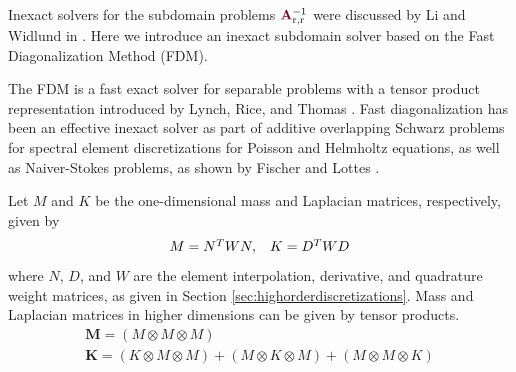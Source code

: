 Inexact solvers for the subdomain problems ${\color{burgundy}\mathbf{A}}_{\text{r}, \text{r}}^{-1}$ were discussed by Li and Widlund in \cite{li2007use}.
Here we introduce an inexact subdomain solver based on the Fast Diagonalization Method (FDM).

The FDM is a fast exact solver for separable problems with a tensor product representation introduced by Lynch, Rice, and Thomas \cite{lynch1964direct}.
Fast diagonalization has been an effective inexact solver as part of additive overlapping Schwarz problems for spectral element discretizations for Poisson and Helmholtz equations, as well as Naiver-Stokes problems, as shown by Fischer and Lottes \cite{fischer2005hybrid}.

Let $M$ and $K$ be the one-dimensional mass and Laplacian matrices, respectively, given by
\begin{equation}
\begin{array}{c c}
M = N^T W N,  &  K = D^T W D
\end{array}
\end{equation}
where $N$, $D$, and $W$ are the element interpolation, derivative, and quadrature weight matrices, as given in Section \ref{sec:highorderdiscretizations}.
Mass and Laplacian matrices in higher dimensions can be given by tensor products.
\begin{equation}
\begin{array}{c}
\mathbf{M} = \left( M \otimes M \otimes M \right)  \\
\mathbf{K} = \left( K \otimes M \otimes M \right) + \left( M \otimes K \otimes M \right) + \left( M \otimes M \otimes K \right)  \\
\end{array}
\end{equation}

